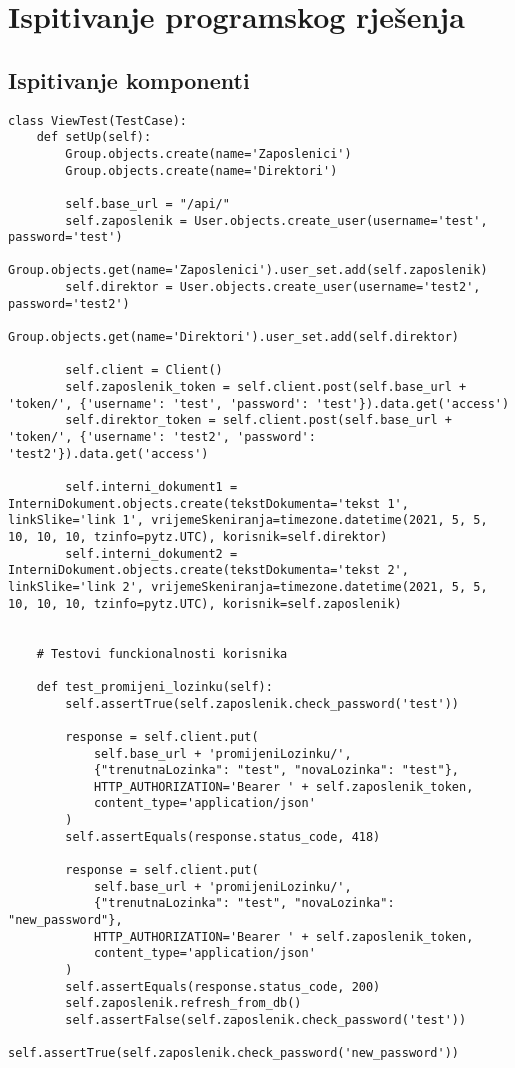 			
			\eject 
		
	
		\section{Ispitivanje programskog rješenja}
			

			\subsection{Ispitivanje komponenti}
\begin{lstlisting}[breaklines=true]
class ViewTest(TestCase):
	def setUp(self):
		Group.objects.create(name='Zaposlenici')
		Group.objects.create(name='Direktori')

		self.base_url = "/api/"
		self.zaposlenik = User.objects.create_user(username='test', password='test')
		Group.objects.get(name='Zaposlenici').user_set.add(self.zaposlenik)
		self.direktor = User.objects.create_user(username='test2', password='test2')
		Group.objects.get(name='Direktori').user_set.add(self.direktor)

		self.client = Client()
		self.zaposlenik_token = self.client.post(self.base_url + 'token/', {'username': 'test', 'password': 'test'}).data.get('access')
		self.direktor_token = self.client.post(self.base_url + 'token/', {'username': 'test2', 'password': 'test2'}).data.get('access')

		self.interni_dokument1 = InterniDokument.objects.create(tekstDokumenta='tekst 1', linkSlike='link 1', vrijemeSkeniranja=timezone.datetime(2021, 5, 5, 10, 10, 10, tzinfo=pytz.UTC), korisnik=self.direktor)
		self.interni_dokument2 = InterniDokument.objects.create(tekstDokumenta='tekst 2', linkSlike='link 2', vrijemeSkeniranja=timezone.datetime(2021, 5, 5, 10, 10, 10, tzinfo=pytz.UTC), korisnik=self.zaposlenik)


	# Testovi funckionalnosti korisnika

	def test_promijeni_lozinku(self):
		self.assertTrue(self.zaposlenik.check_password('test'))

		response = self.client.put(
			self.base_url + 'promijeniLozinku/',
			{"trenutnaLozinka": "test", "novaLozinka": "test"},
			HTTP_AUTHORIZATION='Bearer ' + self.zaposlenik_token,
			content_type='application/json'
		)
		self.assertEquals(response.status_code, 418)

		response = self.client.put(
			self.base_url + 'promijeniLozinku/',
			{"trenutnaLozinka": "test", "novaLozinka": "new_password"},
			HTTP_AUTHORIZATION='Bearer ' + self.zaposlenik_token,
			content_type='application/json'
		)
		self.assertEquals(response.status_code, 200)
		self.zaposlenik.refresh_from_db()
		self.assertFalse(self.zaposlenik.check_password('test'))
		self.assertTrue(self.zaposlenik.check_password('new_password'))


\end{lstlisting}
